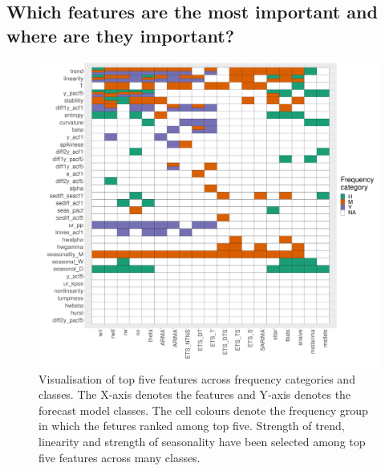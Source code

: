 \documentclass[11pt,a4paper,]{article}
\begin{document}
\hypertarget{which-features-are-the-most-important-and-where-are-they-important}{%
\subsection{Which features are the most important and where are they important?}\label{which-features-are-the-most-important-and-where-are-they-important}}

\begin{figure}[h]

{\centering \includegraphics[width=\textwidth]{figure/viplot-1} 

}

\caption{Visualisation  of top five features across frequency categories and classes. The X-axis denotes the features and Y-axis denotes the forecast model classes. The cell colours denote the frequency group in which the fetures ranked among top five. Strength of trend, linearity and strength of seasonality have been selected among top five features across many classes.}\label{fig:viplot}
\end{figure}
\end{document}
